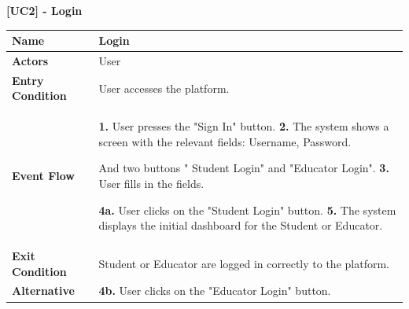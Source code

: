 \clearpage
\raggedright
\textbf{[UC2] - Login}
\begin{table}[h]
\begin{tabular}{|l|p{12cm}|} \hline 

\rule[-3mm]{0mm}{1cm}
\textbf{Name} & Login \\ \hline 

\rule[-3mm]{0mm}{1cm}
\textbf{Actors} & User  \\ \hline 

\rule[-3mm]{0mm}{1cm}
\textbf{Entry Condition} & User accesses the platform. \\ \hline 

\rule[-3mm]{0mm}{1cm}
\textbf{Event Flow} & 
\textbf{1.} User presses the "Sign In" button.
\vspace{4pt}
\newline
\textbf{2.} The system shows a screen with the relevant fields:
Username,
Password.

And two buttons " Student Login" and "Educator Login".
\vspace{2pt}
\newline
\textbf{3.} User fills in the fields.

\textbf{4a.} User clicks on the "Student Login" button.
\vspace{4pt}
\newline
\textbf{5.} The system displays the initial dashboard for the Student or Educator.

\\ \hline 

\rule[-3mm]{0mm}{1cm}
\textbf{Exit Condition} & Student or Educator are logged in correctly to the platform. \\ \hline
\rule[-3mm]{0mm}{1cm}
\textbf{Alternative} & \textbf{4b.}  User clicks on the "Educator Login" button. \\ \hline

\end{tabular}
\end{table}

